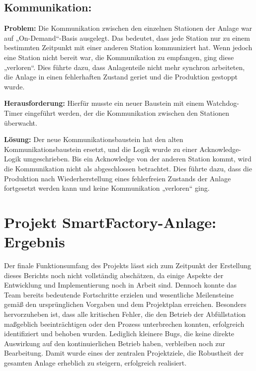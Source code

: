 \subsection{Kommunikation:} 

\textbf{Problem:}  
Die Kommunikation zwischen den einzelnen Stationen der Anlage war auf „On-Demand“-Basis ausgelegt. Das bedeutet, dass jede Station nur zu 
einem bestimmten Zeitpunkt mit einer anderen Station kommuniziert hat. Wenn jedoch eine Station nicht bereit war, die Kommunikation zu 
empfangen, ging diese „verloren“. Dies führte dazu, dass Anlagenteile nicht mehr synchron arbeiteten, die Anlage in einen fehlerhaften 
Zustand geriet und die Produktion gestoppt wurde.

\textbf{Herausforderung:}  
Hierfür musste ein neuer Baustein mit einem Watchdog-Timer eingeführt werden, der die Kommunikation zwischen den Stationen überwacht.

\textbf{Lösung:}  
Der neue Kommunikationsbaustein hat den alten Kommunikationsbaustein ersetzt, und die Logik wurde zu einer Acknowledge-Logik umgeschrieben. 
Bis ein Acknowledge von der anderen Station kommt, wird die Kommunikation nicht als abgeschlossen betrachtet. Dies führte dazu, dass die 
Produktion nach Wiederherstellung eines fehlerfreien Zustands der Anlage fortgesetzt werden kann und keine Kommunikation „verloren“ ging.

\section{Projekt SmartFactory-Anlage: Ergebnis}\label{sec:Projekt SmartFactory-Anlage: Ergebnis}

Der finale Funktionsumfang des Projekts lässt sich zum Zeitpunkt der Erstellung dieses Berichts noch nicht vollständig abschätzen, da einige 
Aspekte der Entwicklung und Implementierung noch in Arbeit sind. Dennoch konnte das Team bereits bedeutende Fortschritte erzielen und wesentliche 
Meilensteine gemäß den ursprünglichen Vorgaben und dem Projektplan erreichen. Besonders hervorzuheben ist, dass alle kritischen Fehler, die den 
Betrieb der Abfüllstation maßgeblich beeinträchtigen oder den Prozess unterbrechen konnten, erfolgreich identifiziert und behoben wurden. 
Lediglich kleinere Bugs, die keine direkte Auswirkung auf den kontinuierlichen Betrieb haben, verbleiben noch zur Bearbeitung. Damit wurde 
eines der zentralen Projektziele, die Robustheit der gesamten Anlage erheblich zu steigern, erfolgreich realisiert.

